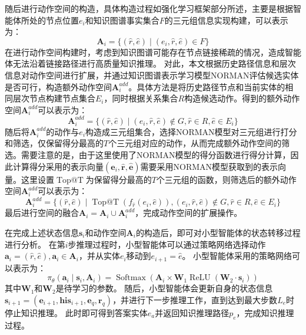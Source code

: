 \documentclass[algorithmlist, AutoFakeBold, AutoFakeSlant, figurelist, tablelist, nomlist, engineering]{seuthesix}
\begin{document}
随后进行动作空间的构造，具体构造过程如强化学习框架部分所述，主要是根据智能体所处的节点位置$e_i$和知识图谱事实集合$F$的三元组信息实现构建，可以表示为：
\begin{equation}
  \bm{A}_i = \{(\hat{r}, \hat{e}) \mid (e_i, \hat{r}, \hat{e}) \in F\}
  \label{base_1}
\end{equation}
在进行动作空间构建时，考虑到知识图谱可能存在节点链接稀疏的情况，造成智能体无法沿着链接路径进行高质量知识推理。
对此，本文根据历史路径信息和层次信息对动作空间进行扩展，并通过知识图谱表示学习模型NORMAN评估候选实体是否可行，构造额外动作空间$\bm{A}_{i}^{add}$。具体方法是将历史路径节点和当前实体的相同层次节点构建节点集合$E_i$，同时根据关系集合$R$构造候选动作。得到的额外动作空间$\bm{A}_{i}^{add}$可以表示为：
\begin{equation}
  \bm{A}_{i}^{add} = \{(\hat{r}, \hat{e}) \mid (e_i, \hat{r}, \hat{e}) \notin G, \hat{r} \in R, \hat{e} \in E_i \}
  \label{extra_1}
\end{equation}
随后将$\bm{A}_{i}^{add}$的动作与$e_i$构造成三元组集合，选择NORMAN模型对三元组进行打分和筛选，仅保留得分最高的$T$个三元组对应的动作，从而完成额外动作空间的筛选。需要注意的是，由于这里使用了NORMAN模型的得分函数进行得分计算，因此计算得分采用的表示向量$(\bm{e}_i, \bm{\hat{r}}, \bm{\hat{e}})$需要采用NORMAN模型获取到的表示向量。这里设置$\operatorname{Top@T}$为保留得分最高的$T$个三元组的函数，则筛选后的额外动作空间$\bm{A}_{i}^{add}$可以表示为：
\begin{equation}
  \bm{A}_i^{add} = \{(\hat{r}, \hat{e}) \mid \operatorname{Top@T}(f_{\hat{r}}(e_i, \hat{e})), (e_i, \hat{r}, \hat{e}) \notin G, \hat{r} \in R, \hat{e} \in E_i \}
\end{equation}
最后进行空间的融合$\bm{A}_i = \bm{A}_i \cup \bm{A}_{i}^{add} $，完成动作空间的扩展操作。

在完成上述状态信息$\bm{s}_i$和动作空间$\bm{A}_i$的构造后，即可对小型智能体的状态转移过程进行分析。
在第$i$步推理过程时，小型智能体可以通过策略网络选择动作$\bm{a}_i = (\hat{r}, \hat{e}), \bm{a}_i \in \bm{A}_i$，并从实体$e_i$移动到$e_{i+1} = \hat{e}$。
小型智能体采用的策略网络可以表示为：
\begin{equation}
  \pi_\theta\left(\bm{a}_i \mid \bm{s}_i, \bm{A}_i\right) =\operatorname{Softmax}\left(\bm{A}_i \times \mathbf{W}_1 \operatorname{ReLU}\left(\mathbf{W}_2 \cdot \bm{s}_i\right)\right)
\end{equation}
其中$\mathbf{W}_1$和$\mathbf{W}_2$是待学习的参数。
随后，小型智能体会更新自身的状态信息$\bm{s}_{i+1} = (\bm{e}_{i+1}, \bm{his}_{i+1}, \bm{e}_q, \bm{r}_q)$，并进行下一步推理工作，直到达到最大步数$L_e$时停止知识推理。
此时即可得到答案实体$e_a$并返回知识推理路径$p_e$，完成知识推理过程。
\end{document}
